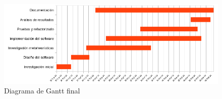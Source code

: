 \begin{figure}[htp]
      \begin{center}
            \includegraphics[width=1\textwidth]{imagenes/gantt-fin.png}
      \end{center}
      \caption{Diagrama de Gantt final}
\end{figure}

